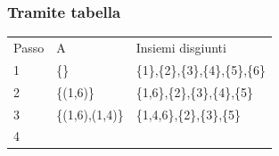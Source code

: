 \documentclass[tikz]{article}
\begin{document}
{{\subsubsection{Tramite tabella}

\begin{longtable}[]{@{}lll@{}}
\toprule
\begin{minipage}[t]{0.30\columnwidth}\raggedright\strut
{Passo}\strut
\end{minipage} & \begin{minipage}[t]{0.30\columnwidth}\raggedright\strut
{A}\strut
\end{minipage} & \begin{minipage}[t]{0.30\columnwidth}\raggedright\strut
{Insiemi disgiunti}\strut
\end{minipage}\tabularnewline
\begin{minipage}[t]{0.30\columnwidth}\raggedright\strut
{1}\strut
\end{minipage} & \begin{minipage}[t]{0.30\columnwidth}\raggedright\strut
{\{\}}\strut
\end{minipage} & \begin{minipage}[t]{0.30\columnwidth}\raggedright\strut
{\{1\},\{2\},\{3\},\{4\},\{5\},\{6\}}\strut
\end{minipage}\tabularnewline
\begin{minipage}[t]{0.30\columnwidth}\raggedright\strut
{2}\strut
\end{minipage} & \begin{minipage}[t]{0.30\columnwidth}\raggedright\strut
{\{(1,6)\}}\strut
\end{minipage} & \begin{minipage}[t]{0.30\columnwidth}\raggedright\strut
{\{1,6\},\{2\},\{3\},\{4\},\{5\}}\strut
\end{minipage}\tabularnewline
\begin{minipage}[t]{0.30\columnwidth}\raggedright\strut
{3}\strut
\end{minipage} & \begin{minipage}[t]{0.30\columnwidth}\raggedright\strut
{\{(1,6),(1,4)\}}\strut
\end{minipage} & \begin{minipage}[t]{0.30\columnwidth}\raggedright\strut
{\{1,4,6\},\{2\},\{3\},\{5\}}\strut
\end{minipage}\tabularnewline
\begin{minipage}[t]{0.30\columnwidth}\raggedright\strut
{4}\strut
\end{minipage} & \begin{minipage}[t]{0.30\columnwidth}\raggedright\strut

\end{minipage}
\end{longtable}}}
\end{document}

